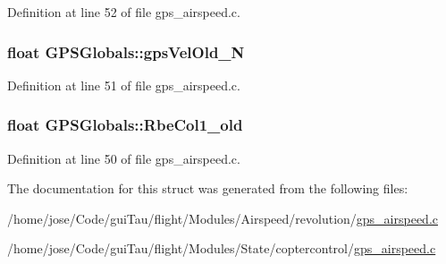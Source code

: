 Definition at line 52 of file gps\-\_\-airspeed.\-c.

\hypertarget{struct_g_p_s_globals_aed518d0e767d4418cae161cd79bcbb14}{
\subsubsection[{gps\-Vel\-Old\-\_\-\-N}]{\setlength{\rightskip}{0pt plus 5cm}float G\-P\-S\-Globals\-::gps\-Vel\-Old\-\_\-\-N}}\label{struct_g_p_s_globals_aed518d0e767d4418cae161cd79bcbb14}


Definition at line 51 of file gps\-\_\-airspeed.\-c.

\hypertarget{struct_g_p_s_globals_a838fd35b2b5e092ed234f1e023a8a171}{
\subsubsection[{Rbe\-Col1\-\_\-old}]{\setlength{\rightskip}{0pt plus 5cm}float G\-P\-S\-Globals\-::\-Rbe\-Col1\-\_\-old}}\label{struct_g_p_s_globals_a838fd35b2b5e092ed234f1e023a8a171}


Definition at line 50 of file gps\-\_\-airspeed.\-c.



The documentation for this struct was generated from the following files\-:\begin{DoxyCompactItemize}
\item 
/home/jose/\-Code/gui\-Tau/flight/\-Modules/\-Airspeed/revolution/\hyperlink{_airspeed_2revolution_2gps__airspeed_8c}{gps\-\_\-airspeed.\-c}\item 
/home/jose/\-Code/gui\-Tau/flight/\-Modules/\-State/coptercontrol/\hyperlink{_state_2coptercontrol_2gps__airspeed_8c}{gps\-\_\-airspeed.\-c}\end{DoxyCompactItemize}
